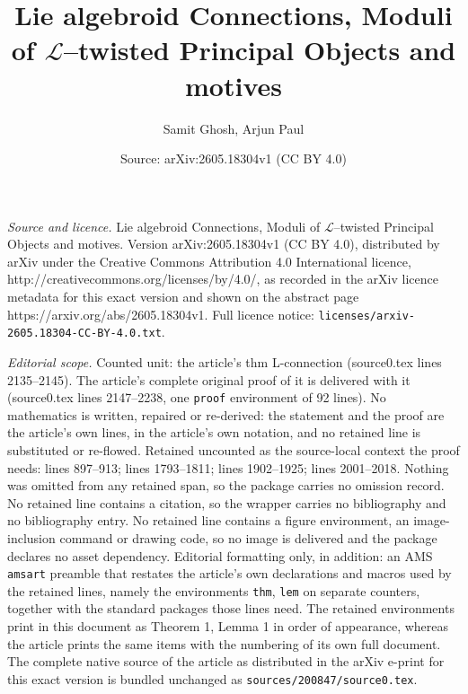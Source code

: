 \documentclass[10pt,a4paper]{amsart}
\title{Lie algebroid Connections, Moduli of $\mathcal{L}$--twisted Principal Objects and motives}
\author{Samit Ghosh, Arjun Paul}
\date{Source: arXiv:2605.18304v1 (CC BY 4.0)}
\begin{document}
\maketitle

\noindent\emph{Source and licence.} Lie algebroid Connections, Moduli of $\mathcal{L}$--twisted Principal Objects and motives. Version arXiv:2605.18304v1 (CC BY 4.0), distributed by arXiv under the Creative Commons Attribution 4.0 International licence, http://creativecommons.org/licenses/by/4.0/, as recorded in the arXiv licence metadata for this exact version and shown on the abstract page https://arxiv.org/abs/2605.18304v1. Full licence notice: \texttt{licenses/arxiv-2605.18304-CC-BY-4.0.txt}.\par\smallskip

\noindent\textit{Editorial scope.} Counted unit: the article's thm L-connection (source0.tex lines 2135--2145). The article's complete original proof of it is delivered with it (source0.tex lines 2147--2238, one \texttt{proof} environment of 92 lines). No mathematics is written, repaired or re-derived: the statement and the proof are the article's own lines, in the article's own notation, and no retained line is substituted or re-flowed.  Retained uncounted as the source-local context the proof needs: lines 897--913; lines 1793--1811; lines 1902--1925; lines 2001--2018.  Nothing was omitted from any retained span, so the package carries no omission record.  No retained line contains a citation, so the wrapper carries no bibliography and no bibliography entry.  No retained line contains a figure environment, an image-inclusion command or drawing code, so no image is delivered and the package declares no asset dependency.  Editorial formatting only, in addition: an AMS \texttt{amsart} preamble that restates the article's own declarations and macros used by the retained lines, namely the environments \texttt{thm}, \texttt{lem} on separate counters, together with the standard packages those lines need.  The retained environments print in this document as Theorem 1, Lemma 1 in order of appearance, whereas the article prints the same items with the numbering of its own full document.  The complete native source of the article as distributed in the arXiv e-print for this exact version is bundled unchanged as \texttt{sources/200847/source0.tex}.
\end{document}
